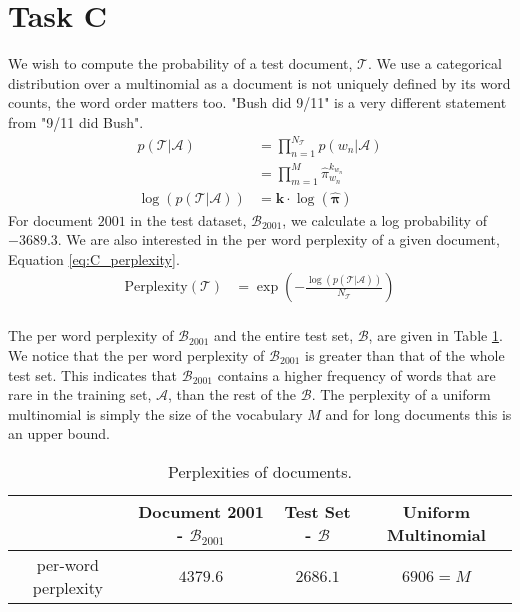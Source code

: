 \documentclass[11pt]{article}
\begin{document}
\section{Task C}
We wish to compute the probability of a test document, $\mathcal{T}$. We use a categorical distribution over a multinomial as a document is not uniquely defined by its word counts, the word order matters too. "Bush did 9/11" is a very different statement from "9/11 did Bush". 
\begin{equation}
    \begin{aligned}
        p(\mathcal{T} | \mathcal{A}) &= \prod_{n=1}^{N_{\mathcal{T}}} p(w_n | \mathcal{A}) \\
          &= \prod_{m=1}^{M} \hat \pi_{w_n}^{k_{w_n}} \\
        \log(p(\mathcal{T} | \mathcal{A})) &=  \boldsymbol{k} \cdot \log(\boldsymbol{\hat \pi})
    \end{aligned}
\end{equation}
For document $2001$ in the test dataset, $\mathcal{B}_{2001}$, we calculate a log probability of $-3689.3$. We are also interested in the per word perplexity of a given document, Equation \ref{eq:C_perplexity}. 
\begin{equation}
    \begin{aligned}
        \text{Perplexity}(\mathcal{T}) &= \exp(-\frac{\log(p(\mathcal{T} | \mathcal{A}))}{N_{\mathcal{T}}} ) \\
    \end{aligned}
    \label{eq:C_perplexity}
\end{equation}

The per word perplexity of $\mathcal{B}_{2001}$ and the entire test set, $\mathcal{B}$, are given in Table \ref{tab:C_perplexity}. We notice that the per word perplexity of $\mathcal{B}_{2001}$ is greater than that of the whole test set. This indicates that $\mathcal{B}_{2001}$ contains a higher frequency of words that are rare in the training set, $\mathcal{A}$, than the rest of the $\mathcal{B}$. The perplexity of a uniform multinomial is simply the size of the vocabulary $M$ and for long documents this is an upper bound.

\begin{table}
    \centering
    \begin{tabular}{|c|ccc|}
        \hline
         & Document 2001 - $\mathcal{B}_{2001}$ & Test Set - $\mathcal{B}$ & Uniform Multinomial \\
        \hline
        per-word perplexity & $4379.6$ & $2686.1$ & $6906 = M$ \\
        \hline
    \end{tabular}
    \caption{Perplexities of documents.}
    \label{tab:C_perplexity}
\end{table}
\end{document}
